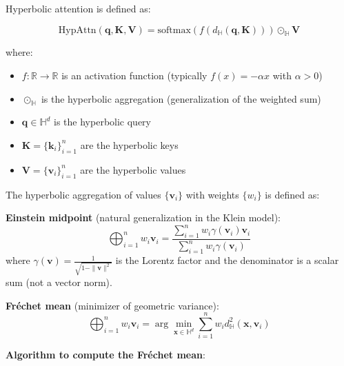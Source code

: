 \begin{definition}\label{def:atencion_hiperbolica}
Hyperbolic attention is defined as:

\begin{equation}
    \text{HypAttn}(\mathbf{q}, \mathbf{K}, \mathbf{V}) = \text{softmax}(f(d_{\mathbb{H}}(\mathbf{q}, \mathbf{K}))) \odot_{\mathbb{H}} \mathbf{V}
    \label{eq:hyperbolic_attention}
\end{equation}

where:
\begin{itemize}
    \item $f: \mathbb{R} \to \mathbb{R}$ is an activation function (typically $f(x) = -\alpha x$ with $\alpha > 0$)
    \item $\odot_{\mathbb{H}}$ is the hyperbolic aggregation (generalization of the weighted sum)
    \item $\mathbf{q} \in \mathbb{H}^d$ is the hyperbolic query
    \item $\mathbf{K} = \{\mathbf{k}_i\}_{i=1}^n$ are the hyperbolic keys
    \item $\mathbf{V} = \{\mathbf{v}_i\}_{i=1}^n$ are the hyperbolic values
\end{itemize}
\end{definition}

\begin{definition}\label{def:agregacion_hiperbolica}
The hyperbolic aggregation of values $\{\mathbf{v}_i\}$ with weights $\{w_i\}$ is defined as:

\textbf{Einstein midpoint} (natural generalization in the Klein model):
\begin{equation}
\bigoplus_{i=1}^n w_i \mathbf{v}_i = \frac{\sum_{i=1}^n w_i \gamma(\mathbf{v}_i) \mathbf{v}_i}{\sum_{i=1}^n w_i \gamma(\mathbf{v}_i)}
\end{equation}
where $\gamma(\mathbf{v}) = \frac{1}{\sqrt{1-\|\mathbf{v}\|^2}}$ is the Lorentz factor and the denominator is a scalar sum (not a vector norm).

\textbf{Fréchet mean} (minimizer of geometric variance):
\begin{equation}
\bigoplus_{i=1}^n w_i \mathbf{v}_i = \arg\min_{\mathbf{x} \in \mathbb{H}^d} \sum_{i=1}^n w_i d_{\mathbb{H}}^2(\mathbf{x}, \mathbf{v}_i)
\end{equation}
\end{definition}

\textbf{Algorithm to compute the Fréchet mean}:


